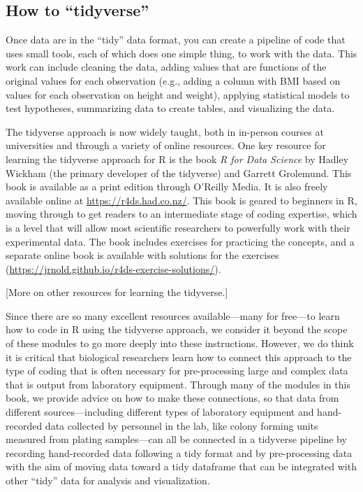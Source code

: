 \documentclass[]{tufte-book}
\begin{document}
\hypertarget{how-to-tidyverse}{%
\subsection{How to ``tidyverse''}\label{how-to-tidyverse}}

Once data are in the ``tidy'' data format, you can create a pipeline of code that
uses small tools, each of which does one simple thing, to work with the data.
This work can include cleaning the data, adding values that are functions of the
original values for each observation (e.g., adding a column with BMI based on
values for each observation on height and weight), applying statistical models to
test hypotheses, summarizing data to create tables, and visualizing the data.

The tidyverse approach is now widely taught, both in in-person courses at
universities and through a variety of online resources. One key resource for
learning the tidyverse approach for R is the book \emph{R for Data Science} by Hadley
Wickham (the primary developer of the tidyverse) and Garrett Grolemund. This
book is available as a print edition through O'Reilly Media. It is also freely
available online at \url{https://r4ds.had.co.nz/}. This book is geared to beginners in
R, moving through to get readers to an intermediate stage of coding expertise,
which is a level that will allow most scientific researchers to powerfully
work with their experimental data. The book includes exercises for practicing the
concepts, and a separate online book is available with solutions for the
exercises (\url{https://jrnold.github.io/r4ds-exercise-solutions/}).

{[}More on other resources for learning the tidyverse.{]}

Since there are so many excellent resources available---many for free---to learn
how to code in R using the tidyverse approach, we consider it beyond the scope
of these modules to go more deeply into these instructions. However, we do think
it is critical that biological researchers learn how to connect this approach to
the type of coding that is often necessary for pre-processing large and complex
data that is output from laboratory equipment. Through many of the modules in this book,
we provide advice on how to make these connections, so that data from different
sources---including different types of laboratory equipment and hand-recorded data
collected by personnel in the lab, like colony forming units measured from plating
samples---can all be connected in a tidyverse pipeline by recording hand-recorded
data following a tidy format and by pre-processing data with the aim of moving
data toward a tidy dataframe that can be integrated with other ``tidy'' data for
analysis and visualization.
\end{document}
